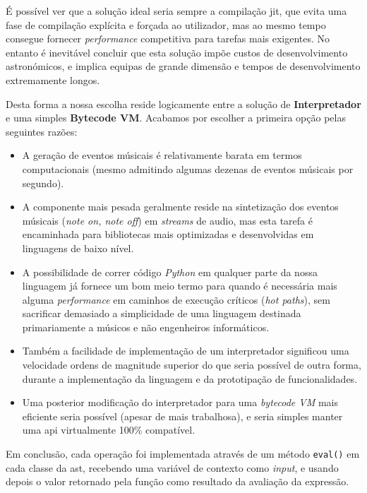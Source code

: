  É possível ver que a solução ideal seria sempre a compilação \acrfull{jit}, que evita uma fase de compilação explícita e forçada ao utilizador, mas ao mesmo tempo consegue fornecer \textit{performance} competitiva para tarefas mais exigentes. No entanto é inevitável concluir que esta solução impõe custos de desenvolvimento astronómicos, e implica equipas de grande dimensão e tempos de desenvolvimento extremamente longos.
 
 Desta forma a nossa escolha reside logicamente entre a solução de \textbf{Interpretador} e uma simples \textbf{Bytecode VM}. Acabamos por escolher a primeira opção pelas seguintes razões:
 \begin{itemize}
  \item A geração de eventos músicais é relativamente barata em termos computacionais (mesmo admitindo algumas dezenas de eventos músicais por segundo).
  \item A componente mais pesada geralmente reside na sintetização dos eventos músicais (\textit{note on, note off}) em \textit{streams} de audio, mas esta tarefa é encaminhada para bibliotecas mais optimizadas e desenvolvidas em linguagens de baixo nível.
  \item A possibilidade de correr código \textit{Python} em qualquer parte da nossa linguagem já fornece um bom meio termo para quando é necessária mais alguma \textit{performance} em caminhos de execução críticos (\textit{hot paths}), sem sacrificar demasiado a simplicidade de uma linguagem destinada primariamente a músicos e não engenheiros informáticos.
  \item Também a facilidade de implementação de um interpretador significou uma velocidade ordens de magnitude superior do que seria possível de outra forma, durante a implementação da linguagem e da prototipação de funcionalidades.
  \item Uma posterior modificação do interpretador para uma \textit{bytecode VM} mais eficiente seria possível (apesar de mais trabalhosa), e seria simples manter uma \acrshort{api} virtualmente 100\% compatível.
 \end{itemize}

 Em conclusão, cada operação foi implementada através de um método \texttt{eval()} em cada classe da \acrshort{ast}, recebendo uma variável de contexto como \textit{input}, e usando depois o valor retornado pela função como resultado da avaliação da expressão.
 

